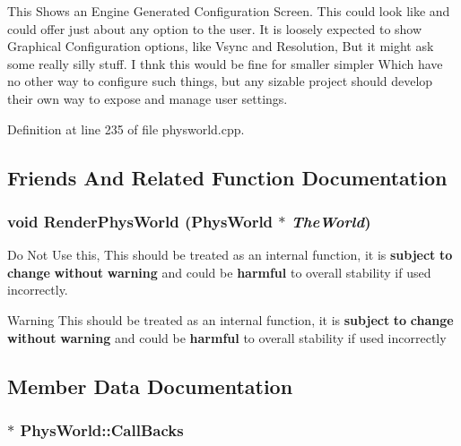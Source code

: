 This Shows an Engine Generated Configuration Screen. This could look like and could offer just about any option to the user. It is loosely expected to show Graphical Configuration options, like Vsync and Resolution, But it might ask some really silly stuff. I thnk this would be fine for smaller simpler Which have no other way to configure such things, but any sizable project should develop their own way to expose and manage user settings. 

Definition at line 235 of file physworld.cpp.

\subsection{Friends And Related Function Documentation}
\hypertarget{classPhysWorld_a54ca2a75bbccb9b2129f434874f1e693}{
\subsubsection[{RenderPhysWorld}]{\setlength{\rightskip}{0pt plus 5cm}void RenderPhysWorld ({\bf PhysWorld} $\ast$ {\em TheWorld})}}
\label{db/df5/classPhysWorld_a54ca2a75bbccb9b2129f434874f1e693}


Do Not Use this, This should be treated as an internal function, it is {\bfseries subject} {\bfseries to} {\bfseries change} {\bfseries without} {\bfseries warning} and could be {\bfseries harmful} to overall stability if used incorrectly. \begin{DoxyWarning}{Warning}
This should be treated as an internal function, it is {\bfseries subject} {\bfseries to} {\bfseries change} {\bfseries without} {\bfseries warning} and could be {\bfseries harmful} to overall stability if used incorrectly 
\end{DoxyWarning}


\subsection{Member Data Documentation}
\hypertarget{classPhysWorld_a080ea6f1584374b07d3c1f29c7ed64df}{
\subsubsection[{CallBacks}]{$\ast$ {\bf PhysWorld::CallBacks}}}
\label{db/df5/classPhysWorld_a080ea6f1584374b07d3c1f29c7ed64df}


